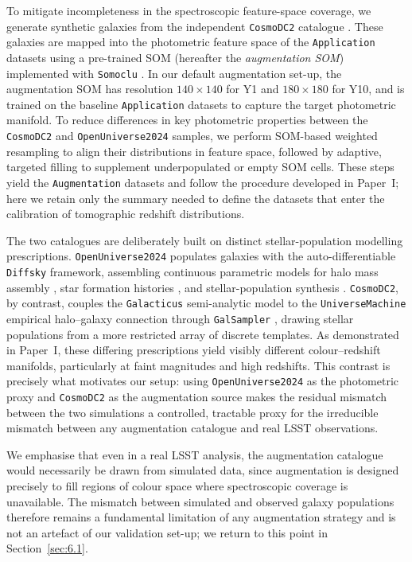 To mitigate incompleteness in the spectroscopic feature-space coverage, we generate synthetic galaxies from the independent \texttt{CosmoDC2} catalogue \citep{2019ApJS..245...26K}. These galaxies are mapped into the photometric feature space of the \texttt{Application} datasets using a pre-trained SOM (hereafter the \textit{augmentation SOM}) implemented with \texttt{Somoclu} \citep{2013arXiv1305.1422W}. In our default augmentation set-up, the augmentation SOM has resolution \(140 \times 140\) for Y1 and \(180 \times 180\) for Y10, and is trained on the baseline \texttt{Application} datasets to capture the target photometric manifold. To reduce differences in key photometric properties between the \texttt{CosmoDC2} and \texttt{OpenUniverse2024} samples, we perform SOM-based weighted resampling to align their distributions in feature space, followed by adaptive, targeted filling to supplement underpopulated or empty SOM cells. These steps yield the \texttt{Augmentation} datasets and follow the procedure developed in Paper~I; here we retain only the summary needed to define the datasets that enter the calibration of tomographic redshift distributions.

The two catalogues are deliberately built on distinct stellar-population modelling prescriptions. \texttt{OpenUniverse2024} populates galaxies with the auto-differentiable \texttt{Diffsky} framework, assembling continuous parametric models for halo mass assembly \citep{2021OJAp....4E...7H}, star formation histories \citep{2023MNRAS.518..562A}, and stellar-population synthesis \citep{2023MNRAS.521.1741H}. \texttt{CosmoDC2}, by contrast, couples the \texttt{Galacticus} semi-analytic model \citep{2012NewA...17..175B} to the \texttt{UniverseMachine} empirical halo--galaxy connection \citep{2019MNRAS.488.3143B} through \texttt{GalSampler} \citep{2020MNRAS.495.5040H}, drawing stellar populations from a more restricted array of discrete templates. As demonstrated in Paper~I, these differing prescriptions yield visibly different colour--redshift manifolds, particularly at faint magnitudes and high redshifts. This contrast is precisely what motivates our setup: using \texttt{OpenUniverse2024} as the photometric proxy and \texttt{CosmoDC2} as the augmentation source makes the residual mismatch between the two simulations a controlled, tractable proxy for the irreducible mismatch between any augmentation catalogue and real LSST observations.

We emphasise that even in a real LSST analysis, the augmentation catalogue would necessarily be drawn from simulated data, since augmentation is designed precisely to fill regions of colour space where spectroscopic coverage is unavailable. The mismatch between simulated and observed galaxy populations therefore remains a fundamental limitation of any augmentation strategy and is not an artefact of our validation set-up; we return to this point in Section~\ref{sec:6.1}.

